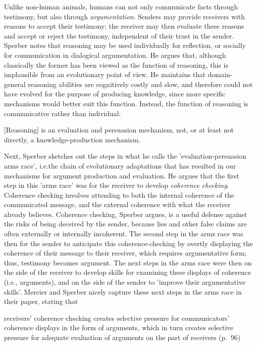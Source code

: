 Unlike non-human animals, humans can not only communicate facts through testimony, but also through \emph{argumentation}. Senders may provide receivers with reasons to accept their testimony; the receiver may then evaluate these reasons and accept or reject the testimony, independent of their trust in the sender.
Sperber notes that reasoning may be used individually for reflection, or socially for communication in dialogical argumentation. He argues that, although classically the former has been viewed as the function of reasoning, this is implausible from an evolutionary point of view. He maintains that domain-general reasoning abilities are cognitively costly and slow, and therefore could not have evolved for the purpose of producing knowledge, since more specific mechanisms would better suit this function. Instead, the function of reasoning is communicative rather than individual:
\begin{quoting}
    {[Reasoning]} is an evaluation and persuasion mechanism, not, or at least not directly, a knowledge-production mechanism.
    \hfill \citep[p.~409]{Sperber01}
\end{quoting}

Next, Sperber sketches out the steps in what he calls the 'evaluation-persuasion arms race', i.e.\@ the chain of evolutionary adaptations that has resulted in our mechanisms for argument production and evaluation.
He argues that the first step in this 'arms race' was for the receiver to develop \emph{coherence checking}. Coherence checking involves attending to both the internal coherence of the communicated message, and the external coherence with what the receiver already believes. Coherence checking, Sperber argues, is a useful defense against the risks of being deceived by the sender, because lies and other false claims are often externally or internally incoherent.
The second step in the arms race was then for the sender to anticipate this coherence-checking by overtly displaying the coherence of their message to their receiver, which requires argumentative form; thus, testimony becomes argument.
The next steps in the arms race were then on the side of the receiver to develop skills for examining these displays of coherence (i.e., arguments), and on the side of the sender to 'improve their argumentative skills'.
Mercier and Sperber nicely capture these next steps in the arms race in their \citeyear{MS11} paper, stating that
\begin{quoting}
    receivers' coherence checking creates selective pressure for communicators' coherence displays in the form of arguments, which in turn creates selective pressure for adequate evaluation of arguments on the part of receivers
    \hfill (p.~96)
\end{quoting}

